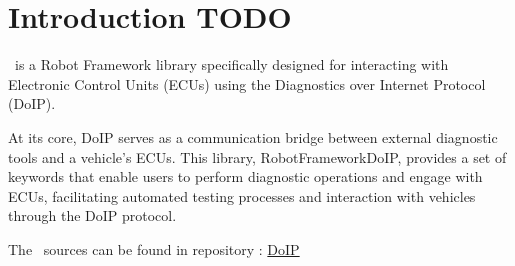 %



%


\section{Introduction TODO}

\pkg\ is a Robot Framework library specifically designed for interacting with Electronic Control Units (ECUs) using the Diagnostics over Internet Protocol (DoIP).

At its core, DoIP serves as a communication bridge between external diagnostic tools and a vehicle's ECUs. This library, RobotFrameworkDoIP, 
provides a set of keywords that enable users to perform diagnostic operations and engage with ECUs, facilitating automated testing processes and interaction with vehicles through the DoIP protocol.

The \pkg\ sources can be found in repository \repo:
\href{https://github.com/test-fullautomation/robotframework-doip}{DoIP}

